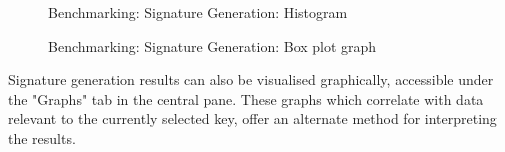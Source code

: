 \documentclass[]{final_report}
\begin{document}
\begin{figure}[H]
    \begin{minipage}{0.7\textwidth}
        \centering
       \caption{Benchmarking: Signature Generation: Histogram}
        \label{fig:image1}
    \end{minipage}
    \hfill %
    \begin{minipage}{0.7\textwidth}
        \centering
       \caption{Benchmarking: Signature Generation: Box plot graph}
        \label{fig:image2}
    \end{minipage}
 \end{figure}

Signature generation results can also be visualised graphically, accessible under the "Graphs" tab in the central pane. These graphs which correlate with data relevant to the currently selected key, offer an alternate method for interpreting the results.
\end{document}
